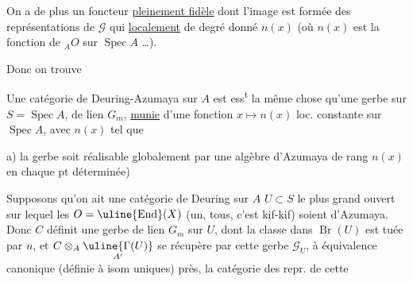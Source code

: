 On a de plus un foncteur \uline{pleinement fidèle}
dont l'image est formée des représentations de $\mathcal G$ qui  \uline{localement}  de degré donné $n(x)$ (où $n(x)$ est la fonction  de ${}_A O$ sur $\operatorname{Spec}A$ \ldots).

Donc on trouve

Une catégorie de Deuring-Azumaya sur $A$ est ess\textsuperscript{t} la même chose qu'une gerbe sur $S=\operatorname{Spec}A$, de lien $G_m$, \uline{munie} d'une fonction $x\longmapsto n(x)$ loc. constante sur $\operatorname{Spec}A$, avec  $n(x)$ tel que

a) la gerbe soit  réalisable globalement par une algèbre d'Azumaya de rang $n(x)$  en chaque pt  déterminée)



Supposons qu'on ait une catégorie de Deuring  sur $A$  
$U\subset S$ le plus grand ouvert sur lequel les $O=\uline{\operatorname{End}}(X)$ (un, tous, c'est kif-kif) soient d'Azumaya. Donc $C$ définit une gerbe  de lien $G_m$ sur $U$, dont la classe dans $\operatorname{Br}(U)$ est tuée par $n$,  et $C\otimes_A\underset{A'}{\uline{\Gamma(U)}}$ se récupère par cette gerbe $\mathcal G_U$, à équivalence canonique (définie à isom uniques) près,  la catégorie des repr. de cette
